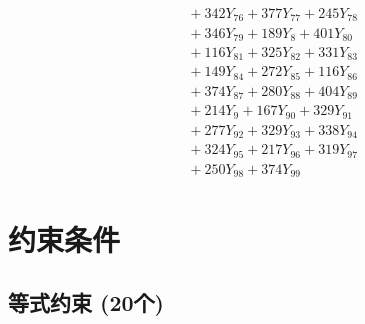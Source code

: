 \documentclass[a4paper,10pt]{article}
\begin{document}
{\begin{align}
&\quad  + 342Y_{76} + 377Y_{77} + 245Y_{78} \\[0.5ex]
&\quad  + 346Y_{79} + 189Y_{8} + 401Y_{80} \\[0.5ex]
&\quad  + 116Y_{81} + 325Y_{82} + 331Y_{83} \\[0.5ex]
&\quad  + 149Y_{84} + 272Y_{85} + 116Y_{86} \\[0.5ex]
&\quad  + 374Y_{87} + 280Y_{88} + 404Y_{89} \\[0.5ex]
&\quad  + 214Y_{9} + 167Y_{90} + 329Y_{91} \\[0.5ex]
&\quad  + 277Y_{92} + 329Y_{93} + 338Y_{94} \\[0.5ex]
&\quad  + 324Y_{95} + 217Y_{96} + 319Y_{97} \\[0.5ex]
&\quad  + 250Y_{98} + 374Y_{99}\nonumber
\end{align}
}

\section{约束条件}

\subsection{等式约束 (20个)}
\end{document}
